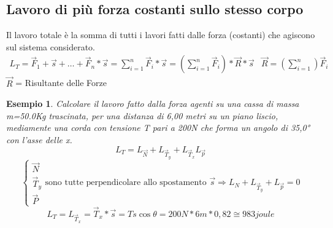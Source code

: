 \documentclass{book}
\newtheorem{esempio}{Esempio}
\begin{document}
\subsection{Lavoro di più forza costanti sullo stesso corpo}
Il lavoro totale è la somma di tutti i lavori fatti dalle forza (costanti) che
agiscono sul sistema considerato.
\begin{equation*}
	\begin{matrix}
	L_T=\vec{F}_1+\vec{s} +
	\dots+\vec{F}_n*\vec{s}=\displaystyle\sum_{i=1}^{n}
	\vec{F}_i*\vec{s}=\left(\displaystyle\sum_{i=1}^{n}
	\vec{F}_i\right)*\vec{R}*\vec{s} &
		\vec{R}=\left(\displaystyle\sum_{i=1}^{n}\right) \vec{F}_i
	\end{matrix}
\end{equation*}
$\vec{R}$ = Risultante delle Forze
\begin{esempio}
	Calcolare il lavoro fatto dalla forza agenti su una cassa di massa m=50.0Kg
	trascinata, per una distanza di 6,00 metri su un piano liscio, mediamente
	una corda con tensione T pari a 200N che forma un angolo di 35,0° con
	l'asse delle x.
	\begin{equation*}
		L_T=L_{\vec{N}}+L_{\vec{T}_y} + L_{\vec{T}_x} L_{\vec{p}}
	\end{equation*}
	\begin{equation*}
		\begin{cases}
			\vec{N}\\
			\vec{T}_y\\
			\vec{P}
		\end{cases}
		\text{sono tutte perpendicolare allo spostamento } \vec{s} \Rightarrow
		L_N + L_{\vec{T}_y} + L_{\vec{p}} = 0
	\end{equation*}
	\begin{equation*}
		L_T=L_{\vec{T}_x}=\vec{T}_x*\vec{s}=Ts\cos \theta = 200N*6m*0,82 \cong
		\boxed{983 joule}
	\end{equation*}
\end{esempio}
\end{document}
